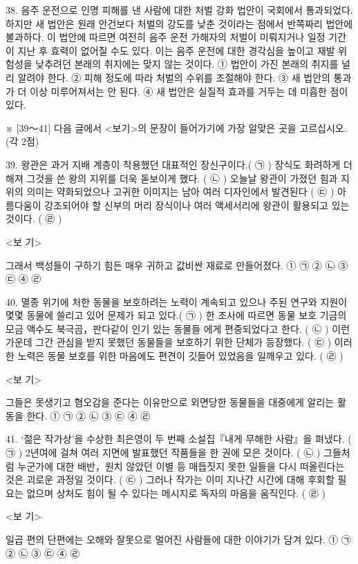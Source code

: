 \documentclass[12pt]{article}
\begin{document}
\begin{enumerate}[1.]
38.
  음주 운전으로 인명 피해를 낸 사람에 대한 처벌 강화 법안이 국회에서
통과되었다. 하지만 새 법안은 원래 안건보다 처벌의 강도를 낮춘 것이라는
점에서 반쪽짜리 법안에 불과하다. 이 법안에 따르면 여전히 음주 운전
가해자의 처벌이 미뤄지거나 일정 기간이 지난 후 효력이 없어질 수도
있다. 이는 음주 운전에 대한 경각심을 높이고 재발 위험성을 낮추려던
본래의 취지에는 맞지 않는 것이다.
① 법안이 가진 본래의 취지를 널리 알려야 한다.
② 피해 정도에 따라 처벌의 수위를 조절해야 한다.
③ 새 법안의 통과가 더 이상 미루어져서는 안 된다.
④ 새 법안은 실질적 효과를 거두는 데 미흡한 점이 있다.




※ [39～41] 다음 글에서 <보기>의 문장이 들어가기에 가장 알맞은 곳을 고르십시오. (각 2점)

39.
  왕관은 과거 지배 계층이 착용했던 대표적인 장신구이다.( ㉠ ) 장식도
화려하게 더해져 그것을 쓴 왕의 지위를 더욱 돋보이게 했다. ( ㉡ )
오늘날 왕관이 가졌던 힘과 지위의 의미는 약화되었으나 고귀한 이미지는
남아 여러 디자인에서 발견된다 ( ㉢ ) 아름다움이 강조되어야 할 신부의
머리 장식이나 여러 액세서리에 왕관이 활용되고 있는 것이다. ( ㉣ )

<보 기>

그래서 백성들이 구하기 힘든 매우 귀하고 값비싼 재료로 만들어졌다.
① ㉠	② ㉡	③ ㉢	④ ㉣


40.
  멸종 위기에 처한 동물을 보호하려는 노력이 계속되고 있으나 주된 연구와
지원이 몇몇 동물에 쓸리고 있어 문제가 되고 있다.( ㉠ ) 한 조사에
따르면 동물 보호 기금의 모금 액수도 북극곰，판다같이 인기 있는 동물들
에게 편중되었다고 한다. ( ㉡ ) 이런 가운데 그간 관심을 받지 못했던
동물들을 보호하기 위한 단체가 등장했다. ( ㉢ ) 이러한 노력은 동물
보호를 위한 마음에도 편견이 깃들어 있었음을 일깨우고 있다. ( ㉣ )

<보 기>

그들은 못생기고 혐오감을 준다는 이유만으로 외면당한 동물들을 대중에게
알리는 활동을 한다.
① ㉠	② ㉡	③ ㉢	④ ㉣


41.
  ‘젊은 작가상’을 수상한 최은영이 두 번째 소설집『내게 무해한 사람』을
펴냈다. ( ㉠ ) 2년여에 걸쳐 여러 지면에 발표했던 작품들을 한 권에
모은 것이다. ( ㉡ ) 그들처럼 누군가에 대한 배반，원치 않았던 이별 등
매듭짓지 못한 일들을 다시 떠올린다는 것은 괴로운 과정일 것이다.
( ㉢ ) 그러나 작가는 이미 지나간 시간에 대해 후회할 필요는 없으며
상처도 힘이 될 수 있다는 메시지로 독자의 마음을 움직인다. ( ㉣ )

<보 기>

일곱 편의 단편에는 오해와 잘못으로 멀어진 사람들에 대한 이야기가
담겨 있다.
① ㉠	② ㉡	③ ㉢	④ ㉣





\end{enumerate}
\end{document}
